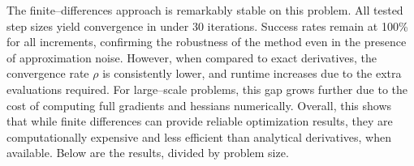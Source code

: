 \documentclass[a4paper,12pt]{article}
\begin{document}
	\noindent The finite--differences approach is remarkably stable on this problem. All tested step sizes yield convergence in under 30 iterations. Success rates remain at 100\% for all increments, confirming the robustness of the method even in the presence of approximation noise. However, when compared to exact derivatives, the convergence rate \( \rho \) is consistently lower, and runtime increases due to the extra evaluations required. For large--scale problems, this gap grows further due to the cost of computing full gradients and hessians numerically. Overall, this shows that while finite differences can provide reliable optimization results, they are computationally expensive and less efficient than analytical derivatives, when available.
	\noindent Below are the results, divided by problem size.
	\newpage
	\begin{itemize}
	

\end{itemize}
\end{document}
